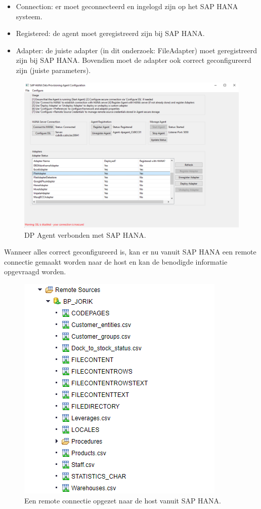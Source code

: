 \begin{itemize}
	\item Connection: er moet geconnecteerd en ingelogd zijn op het SAP HANA systeem.
	\item Registered: de agent moet geregistreerd zijn bij SAP HANA.
	\item Adapter: de juiste adapter (in dit onderzoek: FileAdapter) moet geregistreerd zijn bij SAP HANA. Bovendien moet de adapter ook correct geconfigureerd zijn (juiste parameters).
\end{itemize} 

\begin{figure}[h]
	\centering
	\includegraphics[scale=0.5]{../images/DPAgent.png}
	\caption{DP Agent verbonden met SAP HANA.}
	\label{fig:dpa}
\end{figure}

Wanneer alles correct geconfigureerd is, kan er nu vanuit SAP HANA een remote connectie gemaakt worden naar de host en kan de benodigde informatie opgevraagd worden.

\begin{figure}[h]
	\centering
	\includegraphics[scale=0.5]{../images/remoteconn.png}
	\caption{Een remote connectie opgezet naar de host vanuit SAP HANA.}
	\label{fig:remoteconn}
\end{figure}

